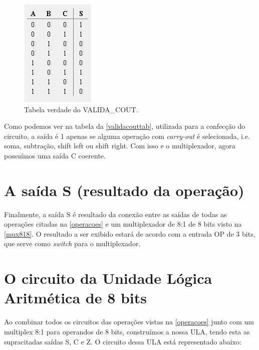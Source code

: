 \documentclass[
	12pt,				%
	openright,			%
	twoside,			%
	a4paper,			%
	english,			%
	french,				%
	spanish,			%
	brazil,				%
	]{abntex2}
\begin{document}
\begin{figure}[H]
	\begin{center}
	    \includegraphics[scale=0.8]{imagens/validacouttab.png}
	\end{center}
\caption{\label{validacouttab}Tabela verdade do VALIDA\_COUT.}
\end{figure}

Como podemos ver na tabela da \autoref{validacouttab}, utilizada para a confecção do circuito, a saída é 1 apenas se alguma operação com \textit{carry-out} é selecionada, i.e. soma, subtração, shift left ou shift right. Com isso e o multiplexador, agora possuímos uma saída C coerente.

\section{A saída S (resultado da operação)}
Finalmente, a saída S é resultado da conexão entre as saídas de todas as operações citadas na \autoref{operacoes} e um multiplexador de 8:1 de 8 bits visto na \autoref{mux818}. O resultado a ser exibido estará de acordo com a entrada OP de 3 bits, que serve como \textit{switch} para o multiplexador.

\section{O circuito da Unidade Lógica Aritmética de 8 bits}

Ao combinar todos os circuitos das operações vistas na \autoref{operacoes} junto com um multiplex 8:1 para operandos de 8 bits, construímos a nossa ULA, tendo esta as supracitadas saídas S, C e Z. O circuito dessa ULA está representado abaixo:
\end{document}
